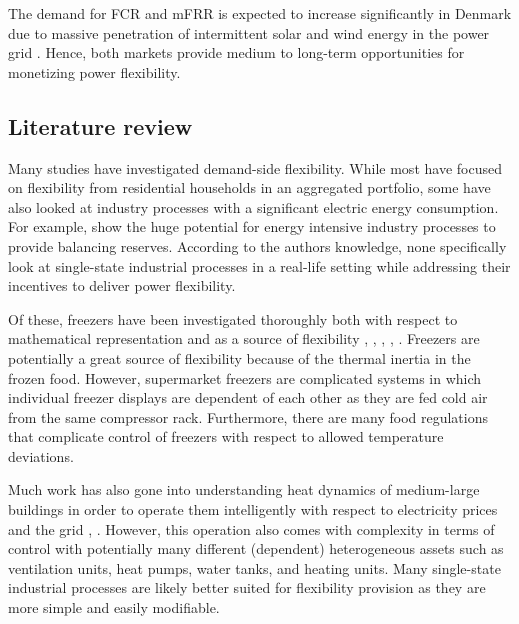 \documentclass[sigconf]{acmart}
\begin{document}
The demand for FCR and mFRR is expected to increase significantly in Denmark due to massive penetration of intermittent solar and wind energy in the power grid \cite{energinet:scenario_report_2022}. Hence, both markets provide medium to long-term opportunities for monetizing power flexibility.


\subsection{Literature review}

Many studies have investigated demand-side flexibility. While most have focused on flexibility from residential households in an aggregated portfolio, some have also looked at industry processes with a significant electric energy consumption. For example, \cite{paulus2011potential} show the huge potential for energy intensive industry processes to provide balancing reserves. According to the authors knowledge, none specifically look at single-state industrial processes in a real-life setting while addressing their incentives to deliver power flexibility.

Of these, freezers have been investigated thoroughly both with respect to mathematical representation \cite{pedersen2016improving}  and as a source of flexibility \cite{sossan2016grey}, \cite{o2013modelling}, \cite{de2019leveraging}, \cite{misaghian2022fast}, \cite{vrettos2016fast}. Freezers are potentially a great source of flexibility because of the thermal inertia in the frozen food. However, supermarket freezers are complicated systems in which individual freezer displays are dependent of each other as they are fed cold air from the same compressor rack. Furthermore, there are many food regulations that complicate control of freezers with respect to allowed temperature deviations.

Much work has also gone into understanding heat dynamics of medium-large buildings \cite{thilker2021non} in order to operate them intelligently with respect to electricity prices and the grid \cite{contreras2018tractable}, \cite{finck2018quantifying}. However, this operation also comes with complexity in terms of control with potentially many different (dependent) heterogeneous assets such as ventilation units, heat pumps, water tanks, and heating units. Many single-state industrial processes are likely better suited for flexibility provision as they are more simple and easily modifiable.
\end{document}
